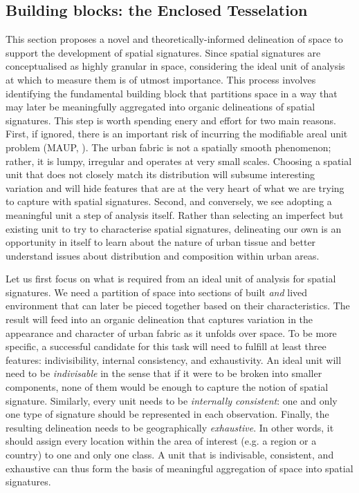 \subsection{Building blocks: the Enclosed Tesselation}
\label{ssec:ss_et}

This section proposes a novel and theoretically-informed delineation of space
to support the development of spatial signatures.
Since spatial signatures are conceptualised as highly granular in space,
considering the ideal unit of analysis at which to measure them is of utmost
importance.
%
This process involves identifying the fundamental building block that
partitions space in a way that may later be meaningfully aggregated into
organic delineations of spatial signatures.
%
This step is worth spending enery and effort for two main reasons.
First, if ignored, there is an important risk of incurring the modifiable
areal unit problem (MAUP, \citealp{openshaw1981modifiable}). The urban fabric is
not a spatially smooth phenomenon; rather, it is lumpy, irregular and operates
at very small scales.
%
Choosing a spatial unit that does not closely match its distribution will
subsume interesting variation and will hide features that are at the very
heart of what we are trying to capture with spatial signatures.
Second, and conversely, we see adopting a meaningful unit a step of analysis
itself. Rather than selecting an imperfect but existing unit to try to
characterise spatial signatures, delineating our own is an opportunity in
itself to learn about the nature of urban tissue and better understand issues
about distribution and composition within urban areas.

Let us first focus on what is required from an ideal unit of analysis for
spatial signatures. We need a partition of space into sections of built
\textit{and} lived environment that can later be pieced together based on
their characteristics. The result will feed into an organic delineation that
captures variation in the appearance and character of urban fabric as it
unfolds over space.
%
To be more specific, a successful candidate for this task will need to fulfill
at least three features: indivisibility, internal consistency, and exhaustivity.
An ideal unit will need to be \textit{indivisable} in the sense that if it
were to be broken into smaller components, none of them would be enough to
capture the notion of spatial signature.
Similarly, every unit needs to be \textit{internally consistent}: one and only
one type of signature should be represented in each observation.
Finally, the resulting delineation needs to be geographically
\textit{exhaustive}. In other words, it should assign every location within
the area of interest (e.g. a region or a country) to one and only one class.
A unit that is indivisable, consistent, and exhaustive can thus form the basis
of meaningful aggregation of space into spatial signatures.

